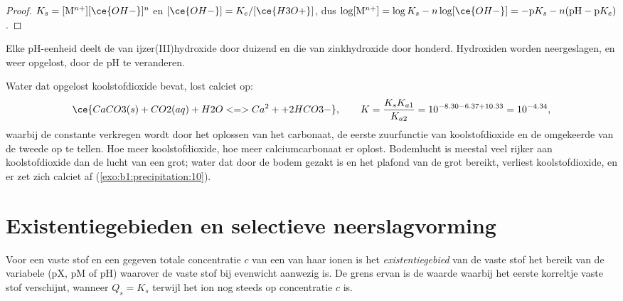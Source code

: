 \begin{proof}
$K_s = [\mathrm{M}^{n+}][\ce{OH-}]^n$ en $[\ce{OH-}] = K_e/[\ce{H3O+}]$,
dus $\log[\mathrm{M}^{n+}] = \log K_s - n\log[\ce{OH-}] = -\mathrm{p}K_s -
n(\mathrm{pH} - \mathrm{p}K_e)$.
\end{proof}

Elke pH-eenheid deelt de  van ijzer(III)hydroxide door
duizend en die van zinkhydroxide door honderd. Hydroxiden worden
neergeslagen, en weer opgelost, door de pH te veranderen.

\begin{example}\label{ex:b1:precipitation:cave}
Water dat opgelost koolstofdioxide bevat, lost calciet op:
\[
  \ce{CaCO3(s) + CO2(aq) + H2O <=> Ca^2+ + 2HCO3-}, \qquad
  K = \frac{K_s K_{a1}}{K_{a2}} = 10^{-8.30 - 6.37 + 10.33} = 10^{-4.34} ,
\]
waarbij de constante verkregen wordt door het oplossen van het carbonaat,
de eerste zuurfunctie van koolstofdioxide en de omgekeerde van de tweede
op te tellen. Hoe meer koolstofdioxide, hoe meer calciumcarbonaat er
oplost. Bodemlucht is meestal veel rijker aan koolstofdioxide dan de
lucht van een grot; water dat door de bodem gezakt is en het plafond van
de grot bereikt, verliest koolstofdioxide, en er zet zich calciet af
(\cref{exo:b1:precipitation:10}).
\end{example}

\section{Existentiegebieden en selectieve neerslagvorming}\label{sec:b1:precipitation:domains}

\begin{definition}[Existentiegebied]\label{def:b1:precipitation:existence-domain}
Voor een vaste stof en een gegeven totale concentratie $c$ van een van
haar ionen is het \emph{existentiegebied} van de
vaste stof het bereik van de variabele (pX, pM of pH) waarover de vaste
stof bij evenwicht aanwezig is. De grens ervan is de waarde waarbij het
eerste korreltje vaste stof verschijnt, wanneer $Q_s = K_s$ terwijl het
ion nog steeds op concentratie $c$ is.
\end{definition}

